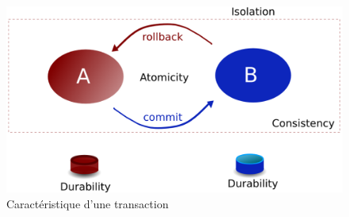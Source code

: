 {  \begin{figure}[hb]
    \begin{center}
      \includegraphics[scale=0.4]{img/transaction.png}
      \caption{Caractéristique d'une transaction}
      \label{tx}
    \end{center}
  \end{figure}
}


